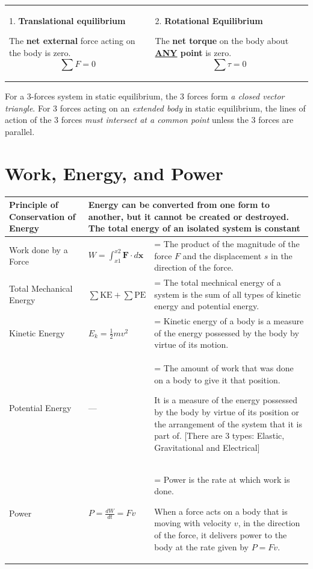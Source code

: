 \documentclass[a4paper,11pt]{article}
\newlength{\oldparskip}
\begin{document}
			\begin{tabular}{@{} C{0.48\textwidth} C{0.48\textwidth}  @{}}
				1. \textbf{Translational equilibrium} \par The \textbf{net external} force acting on the body is zero. $$\sum F = 0$$ & 2. \textbf{Rotational Equilibrium} \par The \textbf{net torque} on the body about \textbf{\underline{ANY} point} is zero. $$\sum \tau = 0$$ \vspace*{-\baselineskip} \\
			\end{tabular}
			
			For a 3-forces system in static equilibrium, the 3 forces form \textit{a closed vector triangle}. For 3 forces acting on an \textit{extended body} in static equilibrium, the lines of action of the 3 forces \textit{must intersect at a common point} unless the 3 forces are parallel.
	\section{Work, Energy, and Power}
		\begin{center}
			\renewcommand{\arraystretch}{1.2}
			\begin{tabular}{p{4cm} l >{\parskip=\oldparskip}p{7.7cm} @{}}
				\toprule
				Principle of Conservation of Energy & \multicolumn{2}{p{10.7cm}}{Energy can be \textbf{converted} from one form to another, but it \textbf{cannot be created or destroyed}. The \textbf{total energy} of an \textbf{isolated} system is constant}\\
				\midrule
				Work done by a Force & $\displaystyle W=\int_{x1}^{x2} \textbf{F} \cdot d\textbf{x} $ & The product of the magnitude of the force $F$ and the displacement $s$ in the direction of the force. \\
				Total Mechanical Energy & $\sum \textrm{KE} + \sum \textrm{PE}$ & The total mechnical energy of a system is the sum of all types of kinetic energy and potential energy. \\
				Kinetic Energy & $E_k = \frac{1}{2}mv^2$ & Kinetic energy of a body is a measure of the energy possessed by the body by virtue of its motion.\\
				Potential Energy & --- & The amount of work that was done on a body to give it that position. \par It is a measure of the energy possessed by the body by virtue of its position or the arrangement of the system that it is part of. [There are 3 types: Elastic, Gravitational and Electrical]\\
				Power & $\displaystyle P=\frac{dW}{dt}=Fv$ & Power is the rate at which work is done. \par When a force acts on a body that is moving with velocity $v$, in the direction of the force, it delivers power to the body at the rate given by $P=Fv$.\\
				\bottomrule
			\end{tabular}
		\end{center}
\end{document}
